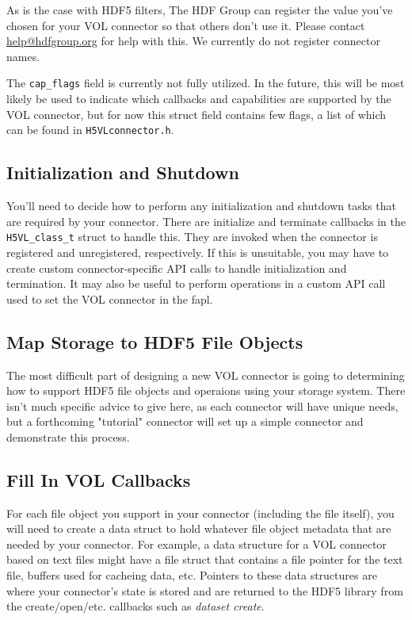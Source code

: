 As is the case with HDF5 filters, The HDF Group can register the value you've
chosen for your VOL connector so that others don't use it. Please contact
\href{mailto:help@hdfgroup.org}{help@hdfgroup.org} for help with this. We currently
do not register connector names.

The {\tt cap\_flags} field is currently not fully utilized. In the future, this
will be most likely be used to indicate which callbacks and capabilities are
supported by the VOL connector, but for now this struct field contains few flags, 
a list of which can be found in {\tt H5VLconnector.h}.

\subsection{Initialization and Shutdown}

You'll need to decide how to perform any initialization and shutdown tasks that
are required by your connector. There are initialize and terminate callbacks
in the {\tt H5VL\_class\_t} struct to handle this. They are invoked when
the connector is registered and unregistered, respectively. If this is
unsuitable, you may have to create custom connector-specific API calls to handle
initialization and termination. It may also be useful to perform operations in
a custom API call used to set the VOL connector in the fapl.

\subsection{Map Storage to HDF5 File Objects}

The most difficult part of designing a new VOL connector is going to determining
how to support HDF5 file objects and operaions using your storage system.
There isn't much specific advice to give here, as
each connector will have unique needs, but a forthcoming "tutorial" connector
will set up a simple connector and demonstrate this process.


\subsection{Fill In VOL Callbacks}

For each file object you support in your connector (including the file itself),
you will need to create a data struct to hold whatever file object
metadata that are needed by your connector. For example, a data structure for
a VOL connector based on text files might have a file struct that contains a
file pointer for the text file, buffers used for cacheing data, etc. Pointers
to these data structures are where your connector's state is stored and are
returned to the HDF5 library from the create/open/etc. callbacks such as
\textit{dataset create}.

